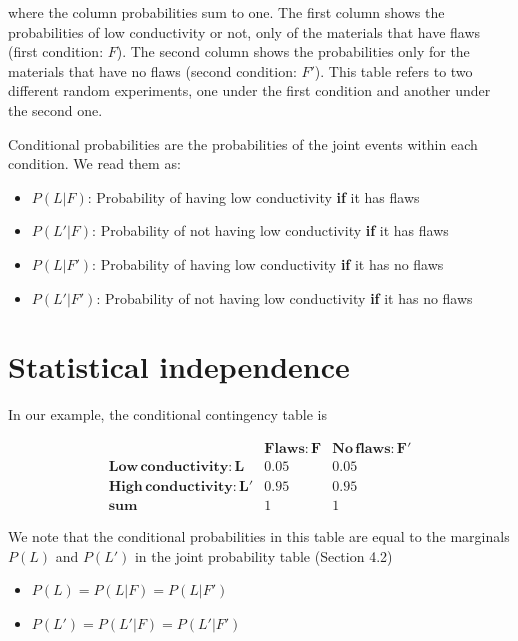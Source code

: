 \documentclass[
]{book}
\providecommand{\tightlist}{%
  \setlength{\itemsep}{0pt}\setlength{\parskip}{0pt}}
\begin{document}
where the column probabilities sum to one. The first column shows the probabilities of low conductivity or not, only of the materials that have flaws (first condition: \(F\)). The second column shows the probabilities only for the materials that have no flaws (second condition: \(F'\)). This table refers to two different random experiments, one under the first condition and another under the second one.

Conditional probabilities are the probabilities of the joint events within each condition. We read them as:

\begin{itemize}
\tightlist
\item
  \(P(L| F)\): Probability of having low conductivity \textbf{if} it has flaws
\item
  \(P(L'| F)\): Probability of not having low conductivity \textbf{if} it has flaws
\item
  \(P(L|F ')\): Probability of having low conductivity \textbf{if} it has no flaws
\item
  \(P(L'|F ')\): Probability of not having low conductivity \textbf{if} it has no flaws
\end{itemize}

\hypertarget{statistical-independence}{%
\section{Statistical independence}\label{statistical-independence}}

In our example, the conditional contingency table is

\[
\begin{array}{cc|c}
    & \mathbf{Flaws: F} & \mathbf{No\, flaws: F'} \\ 
    \mathbf{Low\, conductivity:L} & 0.05 & 0.05 \\ 
    \mathbf{High\, conductivity: L'} & 0.95 & 0.95 \\ 
    \mathbf{sum} & 1 & 1
\end{array}
\]

We note that the conditional probabilities in this table are equal to the marginals \(P(L)\) and \(P(L')\) in the joint probability table (Section 4.2)

\begin{itemize}
\tightlist
\item
  \(P(L)=P(L| F)= P(L|F')\)
\item
  \(P(L')=P(L'| F)= P(L'|F')\)
\end{itemize}
\end{document}
